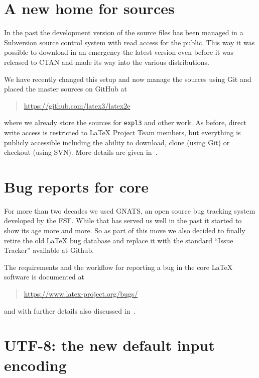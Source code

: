 \documentclass{ltnews}
\providecommand\pkg[1]{\texttt{#1}}
\begin{document}
\maketitle
\tableofcontents

\setlength{}

\section{A new home for \LaTeXe{} sources}

In the past the development version of the \LaTeXe{} source files has
been managed in a Subversion source control system with read access
for the public. This way it was possible to download in an emergency
the latest version even before it was released to CTAN and made its
way into the various distributions.

We have recently changed this setup and now manage the sources using
Git and placed the master sources on GitHub at
\begin{quote}
\url{https://github.com/latex3/latex2e}
\end{quote}
where we already store the sources
for \pkg{expl3} and other work. As before, direct write access is restricted
to \LaTeX{} Project Team members, but everything is publicly accessible
including the ability to download, clone (using Git) or checkout
(using SVN). More details are given in~\cite{Mittelbach:TB39-1}.

\section{Bug reports for core \LaTeXe{}}

For more than two decades we used GNATS, an open source bug tracking
system developed by the FSF. While that has served us well in the past
it started to show its age more and more. So as part of this move we
also decided to finally retire the old \LaTeX{} bug database and replace
it with the standard ``Issue Tracker'' available at Github.

The requirements and the workflow for reporting a bug in the core
\LaTeX{} software is documented at
\begin{quote}
\url{https://www.latex-project.org/bugs/}
\end{quote}
and with further details also discussed in~\cite{Mittelbach:TB39-1}.


\section{UTF-8: the new default input encoding}
\end{document}
